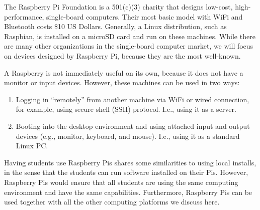 
The Raspberry Pi Foundation is a 501(c)(3) charity that
designs low-cost, high-performance, single-board computers.
Their most basic model with WiFi and Bluetooth costs \$10 US Dollars.
Generally, a Linux distribution, such as Raspbian, is installed
on a microSD card and run on these machines.
While there are many other organizations in the single-board computer market,
we will focus on devices designed by Raspberry Pi, because they  are the most
well-known.

A Raspberry is not immediately useful on its own, because it does not have a
monitor or input devices.
However, these machines can be used in two ways:
\begin{enumerate}
    \item Logging in ``remotely'' from another machine via WiFi or wired
        connection, for example, using secure shell (SSH) protocol.
        I.e., using it as a server. 
    \item Booting into the desktop environment and using attached input and
        output devices (e.g., monitor, keyboard, and mouse).
        I.e., using it as a standard Linux PC. 
\end{enumerate}
Having students use Raspberry Pis shares some similarities to using local
installs, in the sense that the students can run software installed on their
Pis.
However, Raspberry Pis would ensure that all students are using the same
computing environment and have the same capabilities.
Furthermore, Raspberry Pis can be used together with all the other computing platforms we
discuss here.

